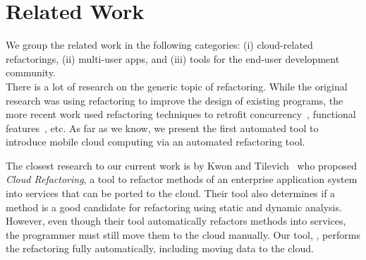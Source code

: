 \documentclass[article]{sigplanconf}
\begin{document}
%




\section{Related Work}
\label{sec:relatedWork}

We group the related work in the following categories: (i) cloud-related refactorings, (ii) multi-user apps, and (iii) tools for the end-user development community. \\

There is a lot of research on the generic topic of refactoring. While the original research was using refactoring to improve the design of existing programs, the more recent work used refactoring techniques to retrofit 
concurrency~\cite{wloka2009refactoring,dig2009refactoring}, functional features~\cite{Gyori:Lambdaficator}, etc.
As far as we know, we present the first automated tool to introduce mobile cloud computing via an automated refactoring tool.

The closest research to our current work is by Kwon and Tilevich~\cite{kwon2013cloud} who proposed \emph{Cloud Refactoring}, a tool to refactor methods of an enterprise application system into services that can be  ported to the cloud. Their tool also determines if a method is a good candidate for refactoring using static and dynamic analysis. However, even though their tool automatically refactors methods into services, the programmer must still move them to the cloud manually.  
Our tool, \tool, performs the refactoring fully automatically, including moving data to the cloud.  
\end{document}
